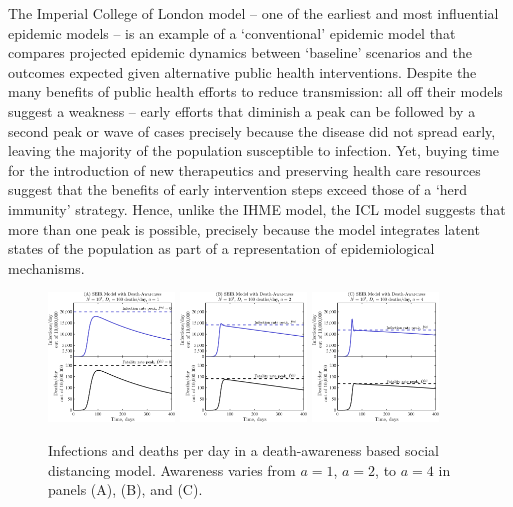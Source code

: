 The Imperial College of London model -- one of the earliest and most influential epidemic models -- is an example of a `conventional' epidemic model
that compares projected epidemic dynamics
between `baseline' scenarios and the outcomes expected
given alternative public health interventions. Despite the many
benefits of public health efforts to reduce transmission: all off their
models suggest a weakness -- early efforts that diminish a peak can be
followed by a second peak or wave of cases precisely because
the disease did not spread early, leaving the majority of the population
susceptible to infection. Yet, buying time for the introduction
of new therapeutics and preserving health care resources suggest
that the benefits of  early intervention steps exceed those of
a `herd immunity' strategy.  Hence, unlike the IHME model,
the ICL model suggests that more than one peak is possible,
precisely because the model integrates latent states of the population
as part of a representation of epidemiological mechanisms.
\begin{figure}[t!]
\begin{center}
\includegraphics[width=0.3\textwidth]{figseir_baseplat_a1_noname.pdf}
\includegraphics[width=0.3\textwidth]{figseir_baseplat_a2_noname.pdf}
\includegraphics[width=0.3\textwidth]{figseir_baseplat_a4_noname.pdf}
\caption{Infections and deaths per day in a death-awareness based
social distancing model. Awareness varies from $a=1$, $a=2$, to $a=4$ 
in panels (A), (B), and (C).
\label{fig.ID_day}}
\end{center}
\end{figure}

